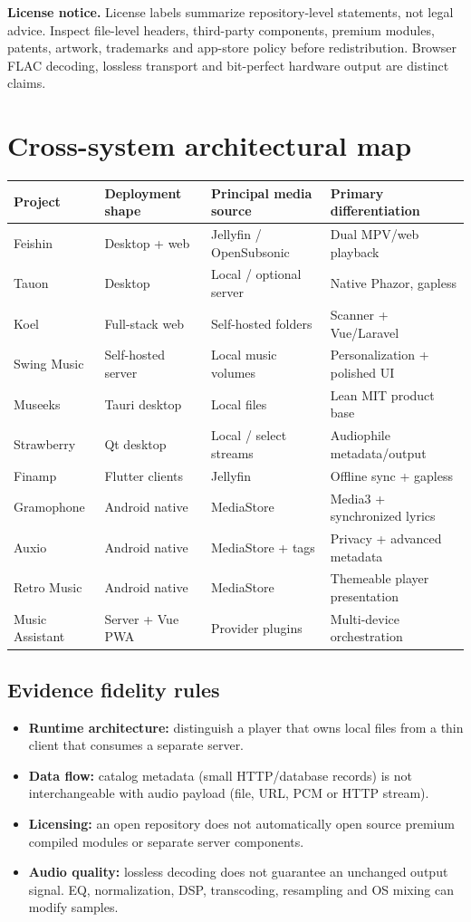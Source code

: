 \documentclass[10pt,a4paper,oneside]{report}
\begin{document}
\textbf{License notice.} License labels summarize repository-level statements, not legal advice. Inspect file-level headers, third-party components, premium modules, patents, artwork, trademarks and app-store policy before redistribution. Browser FLAC decoding, lossless transport and bit-perfect hardware output are distinct claims.

\setcounter{tocdepth}{0}
\tableofcontents
\clearpage
{}
\chapter*{Cross-system architectural map}
\begin{longtable}{@{}p{34mm}p{32mm}p{43mm}p{45mm}@{}}
\toprule
Project & Deployment shape & Principal media source & Primary differentiation\\\midrule\endhead
Feishin & Desktop + web & Jellyfin / OpenSubsonic & Dual MPV/web playback\\
Tauon & Desktop & Local / optional server & Native Phazor, gapless\\
Koel & Full-stack web & Self-hosted folders & Scanner + Vue/Laravel\\
Swing Music & Self-hosted server & Local music volumes & Personalization + polished UI\\
Museeks & Tauri desktop & Local files & Lean MIT product base\\
Strawberry & Qt desktop & Local / select streams & Audiophile metadata/output\\
Finamp & Flutter clients & Jellyfin & Offline sync + gapless\\
Gramophone & Android native & MediaStore & Media3 + synchronized lyrics\\
Auxio & Android native & MediaStore + tags & Privacy + advanced metadata\\
Retro Music & Android native & MediaStore & Themeable player presentation\\
Music Assistant & Server + Vue PWA & Provider plugins & Multi-device orchestration\\
\bottomrule
\end{longtable}
\section*{Evidence fidelity rules}
\begin{itemize}[leftmargin=*]
\item \textbf{Runtime architecture:} distinguish a player that owns local files from a thin client that consumes a separate server.
\item \textbf{Data flow:} catalog metadata (small HTTP/database records) is not interchangeable with audio payload (file, URL, PCM or HTTP stream).
\item \textbf{Licensing:} an open repository does not automatically open source premium compiled modules or separate server components.
\item \textbf{Audio quality:} lossless decoding does not guarantee an unchanged output signal. EQ, normalization, DSP, transcoding, resampling and OS mixing can modify samples.
\end{itemize}
\clearpage
\end{document}
